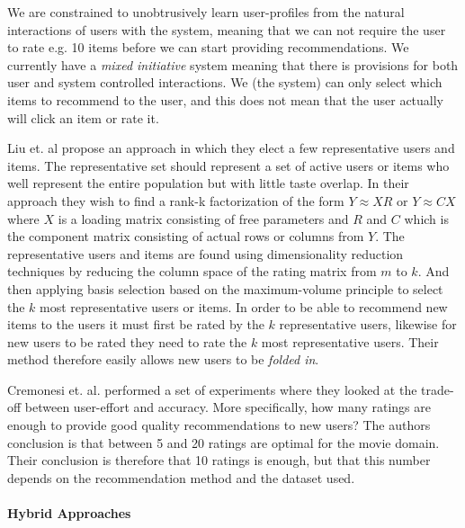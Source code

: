 We are constrained to unobtrusively learn user-profiles from the natural interactions of users with the system, meaning that we can not require the user to rate e.g. 10 items before we can start providing recommendations. We currently have a \emph{mixed initiative} system meaning that there is provisions for both user and system controlled interactions. We (the system) can only select which items to recommend to the user, and this does not mean that the user actually will click an item or rate it.


Liu et. al \cite{Liu2011} propose an approach in which they elect a few representative users and items. The representative set should represent a set of active users or items who well represent the entire population but with little taste overlap. In their approach they wish to find a rank-k factorization of the form $Y \approx XR$ or $Y \approx CX$ where $X$ is a loading matrix consisting of free parameters and $R$ and $C$ which is the component matrix consisting of actual rows or columns from $Y$. The representative users and items are found using dimensionality reduction techniques by reducing the column space of the rating matrix from $m$ to $k$. And then applying basis selection based on the maximum-volume principle to select the $k$ most representative users or items. In order to be able to recommend new items to the users it must first be rated by the $k$ representative users, likewise for new users to be rated they need to rate the $k$ most representative users. Their method therefore easily allows new users to be \emph{folded in}.


Cremonesi et. al. \cite{Cremonesi2012} performed a set of experiments where they looked at the trade-off between user-effort and accuracy. More specifically, how many ratings are enough to provide good quality recommendations to new users? The authors conclusion is that between 5 and 20 ratings are optimal for the movie domain. Their conclusion is therefore that 10 ratings is enough, but that this number depends on the recommendation method and the dataset used.

\paragraph{Hybrid Approaches}

